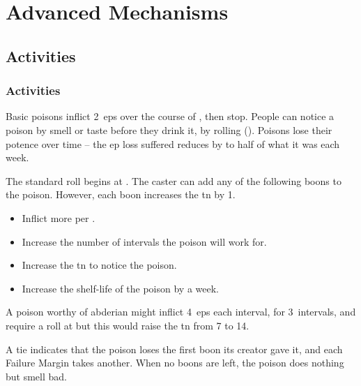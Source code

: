\chapter{Advanced Mechanisms}

\label{skill_uses}

\section{Activities}

\begin{multicols}{2}

\togglefalse{examplecharacter}

\subsection{ Activities}
\label{downtimeActions}


Basic poisons inflict 2~\glspl{ep} over the course of , then stop.
People can notice a poison by smell or taste before they drink it, by rolling  (\tn[7]).
Poisons lose their potence over time -- the \gls{ep} loss suffered reduces by to half of what it was each week.

The standard roll begins at \tn[7].
The caster can add any of the following boons to the poison.
However, each boon increases the \gls{tn} by 1.

\begin{itemize}
  \item
  Inflict  more per .
  \item
  Increase the number of \glspl{interval} the poison will work for.
  \item
  Increase the \gls{tn} to notice the poison.
  \item
  Increase the shelf-life of the poison by a week.
\end{itemize}

A poison worthy of \gls{abderian} might inflict 4~\glspl{ep} each \gls{interval}, for 3~\glspl{interval}, and require a  roll at \tn[10] but this would raise the \gls{tn} from 7 to 14.

A tie indicates that the poison loses the first boon its creator gave it, and each Failure Margin takes another.
When no boons are left, the poison does nothing but smell bad.


\end{multicols}

